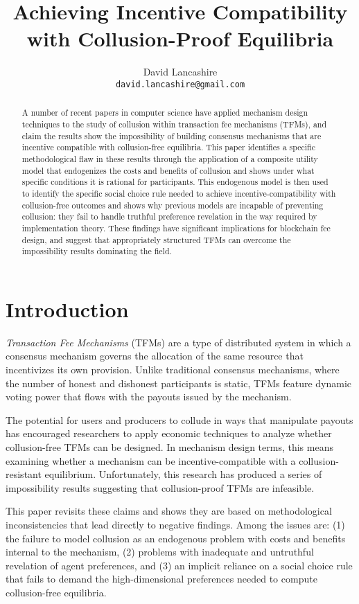 \documentclass[oneside]{article}   	%
\title{Achieving Incentive Compatibility with Collusion-Proof Equilibria}
\author{
  David Lancashire\\
  \texttt{david.lancashire@gmail.com}\\
}
\begin{document}
\maketitle


\begin{abstract}
A number of recent papers in computer science have applied mechanism design techniques to the study of collusion within transaction fee mechanisms (TFMs), and claim the results show the impossibility of building consensus mechanisms that are incentive compatible with collusion-free equilibria. This paper identifies a specific methodological flaw in these results through the application of a composite utility model that endogenizes the costs and benefits of collusion and shows under what specific conditions it is rational for participants. This endogenous model is then used to identify the specific social choice rule needed to achieve incentive-compatibility with collusion-free outcomes and shows why previous models are incapable of preventing collusion: they fail to handle truthful preference revelation in the way required by implementation theory. These findings have significant implications for blockchain fee design, and suggest that appropriately structured TFMs can overcome the impossibility results dominating the field.
\end{abstract}

\section{Introduction \label{sec::introduction}}

\emph{Transaction Fee Mechanisms} (TFMs) are a type of distributed system in which a consensus mechanism governs the allocation of the same resource that incentivizes its own provision. Unlike traditional consensus mechanisms, where the number of honest and dishonest participants is static, TFMs feature dynamic voting power that flows with the payouts issued by the mechanism.

The potential for users and producers to collude in ways that manipulate payouts has encouraged researchers to apply economic techniques to analyze whether collusion-free TFMs can be designed. In mechanism design terms, this means examining whether a mechanism can be incentive-compatible with a collusion-resistant equilibrium. Unfortunately, this research has produced a series of impossibility results suggesting that collusion-proof TFMs are infeasible.

This paper revisits these claims and shows they are based on methodological inconsistencies that lead directly to negative findings. Among the issues are: (1) the failure to model collusion as an endogenous problem with costs and benefits internal to the mechanism, (2) problems with inadequate and untruthful revelation of agent preferences, and (3) an implicit reliance on a social choice rule that fails to demand the high-dimensional preferences needed to compute collusion-free equilibria.
\end{document}
